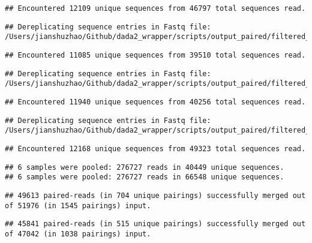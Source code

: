 \documentclass[
]{article}
\begin{document}
\begin{verbatim}
## Encountered 12109 unique sequences from 46797 total sequences read.
\end{verbatim}

\begin{verbatim}
## Dereplicating sequence entries in Fastq file: /Users/jianshuzhao/Github/dada2_wrapper/scripts/output_paired/filtered_input/Orwoll_BI0153_BI_R_filt.fastq.gz
\end{verbatim}

\begin{verbatim}
## Encountered 11085 unique sequences from 39510 total sequences read.
\end{verbatim}

\begin{verbatim}
## Dereplicating sequence entries in Fastq file: /Users/jianshuzhao/Github/dada2_wrapper/scripts/output_paired/filtered_input/Orwoll_BI0215_BI_R_filt.fastq.gz
\end{verbatim}

\begin{verbatim}
## Encountered 11940 unique sequences from 40256 total sequences read.
\end{verbatim}

\begin{verbatim}
## Dereplicating sequence entries in Fastq file: /Users/jianshuzhao/Github/dada2_wrapper/scripts/output_paired/filtered_input/Orwoll_BI0353_BI_R_filt.fastq.gz
\end{verbatim}

\begin{verbatim}
## Encountered 12168 unique sequences from 49323 total sequences read.
\end{verbatim}

\begin{verbatim}
## 6 samples were pooled: 276727 reads in 40449 unique sequences.
## 6 samples were pooled: 276727 reads in 66548 unique sequences.
\end{verbatim}

\begin{verbatim}
## 49613 paired-reads (in 704 unique pairings) successfully merged out of 51976 (in 1545 pairings) input.
\end{verbatim}

\begin{verbatim}
## 45841 paired-reads (in 515 unique pairings) successfully merged out of 47042 (in 1038 pairings) input.
\end{verbatim}
\end{document}
